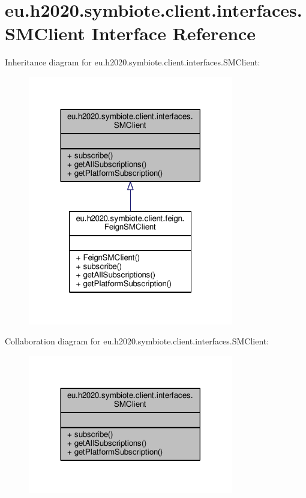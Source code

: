 \hypertarget{interfaceeu_1_1h2020_1_1symbiote_1_1client_1_1interfaces_1_1SMClient}{}\section{eu.\+h2020.\+symbiote.\+client.\+interfaces.\+S\+M\+Client Interface Reference}
\label{interfaceeu_1_1h2020_1_1symbiote_1_1client_1_1interfaces_1_1SMClient}


Inheritance diagram for eu.\+h2020.\+symbiote.\+client.\+interfaces.\+S\+M\+Client\+:
\nopagebreak
\begin{figure}[H]
\begin{center}
\leavevmode
\includegraphics[width=254pt]{interfaceeu_1_1h2020_1_1symbiote_1_1client_1_1interfaces_1_1SMClient__inherit__graph}
\end{center}
\end{figure}


Collaboration diagram for eu.\+h2020.\+symbiote.\+client.\+interfaces.\+S\+M\+Client\+:
\nopagebreak
\begin{figure}[H]
\begin{center}
\leavevmode
\includegraphics[width=254pt]{interfaceeu_1_1h2020_1_1symbiote_1_1client_1_1interfaces_1_1SMClient__coll__graph}
\end{center}
\end{figure}
